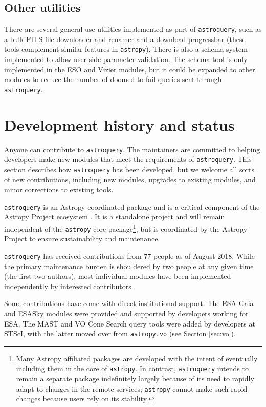 \documentclass[twocolumn]{aastex62}
\newcommand{\package}[1]{\texttt{#1}\xspace}
\newcommand{\astroquery}{\package{astroquery}}
\newcommand{\astropy}{Astropy\xspace}
\newcommand{\astropypkg}{\package{astropy}}
\begin{document}
\subsection{Other utilities}
There are several general-use utilities implemented as part of \astroquery, such
as a bulk FITS file downloader and renamer and a download progressbar (these
tools complement similar features in \astropypkg).  There
is also a schema system implemented to allow user-side parameter validation.
The schema tool is only implemented in the ESO and Vizier modules, but it could
be expanded to other modules to reduce the number of doomed-to-fail queries
sent through \astroquery.

\section{Development history and status}
\label{sec:development}
Anyone can contribute to \astroquery.  The maintainers are committed to helping
developers make new modules that meet the requirements of \astroquery.  This
section describes how \astroquery has been developed, but we welcome all sorts
of new contributions, including new modules, upgrades to existing modules, and
minor corrections to existing tools.

\astroquery is an \astropy coordinated package \citep{APE15} and is a critical
component of the \astropy Project ecosystem \citep{Astropy-Collaboration2018}.
It is a standalone project and will remain independent of the \astropypkg core
package\footnote{Many \astropy affiliated packages are developed with the
intent of eventually including them in the core of \astropypkg.  In contrast,
\astroquery intends to remain a separate package indefinitely largely because
of its need to rapidly adapt to changes in the remote services; \astropypkg
cannot make such rapid changes because users rely on its stability.}, but is
coordinated by the \astropy Project to ensure sustainability and maintenance.

\astroquery has received contributions from 77 people as of August 2018.  While the primary maintenance
burden is shouldered by two people at any given time (the first two authors),
most individual modules have been implemented independently by interested
contributors.

Some contributions have come with direct institutional support.  The ESA Gaia and
ESASky modules were provided and supported by developers working for ESA\@.  The
MAST and VO Cone Search query tools were added by developers at STScI, with the
latter moved over from \texttt{astropy.vo} (see Section \ref{sec:vo}).
\end{document}
